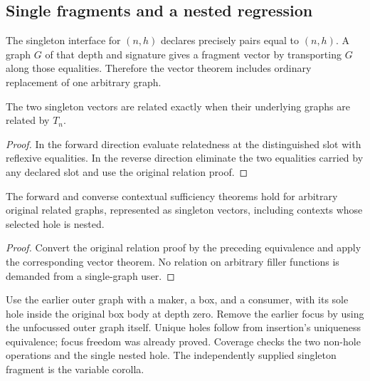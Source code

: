 \subsection{Single fragments and a nested regression}
\begin{definition}
The singleton interface for $(n,h)$ declares precisely pairs equal to $(n,h)$. A graph $G$ of that depth and signature gives a fragment vector by transporting $G$ along those equalities. Therefore the vector theorem includes ordinary replacement of one arbitrary graph.
\end{definition}

\begin{lemma}
The two singleton vectors are related exactly when their underlying graphs are related by $T_n$.
\end{lemma}
\begin{proof}
In the forward direction evaluate relatedness at the distinguished slot with reflexive equalities. In the reverse direction eliminate the two equalities carried by any declared slot and use the original relation proof.
\end{proof}

\begin{corollary}
The forward and converse contextual sufficiency theorems hold for arbitrary original related graphs, represented as singleton vectors, including contexts whose selected hole is nested.
\end{corollary}
\begin{proof}
Convert the original relation proof by the preceding equivalence and apply the corresponding vector theorem. No relation on arbitrary filler functions is demanded from a single-graph user.
\end{proof}

\begin{definition}
Use the earlier outer graph with a maker, a box, and a consumer, with its sole hole inside the original box body at depth zero. Remove the earlier focus by using the unfocussed outer graph itself. Unique holes follow from insertion's uniqueness equivalence; focus freedom was already proved. Coverage checks the two non-hole operations and the single nested hole. The independently supplied singleton fragment is the variable corolla.
\end{definition}

